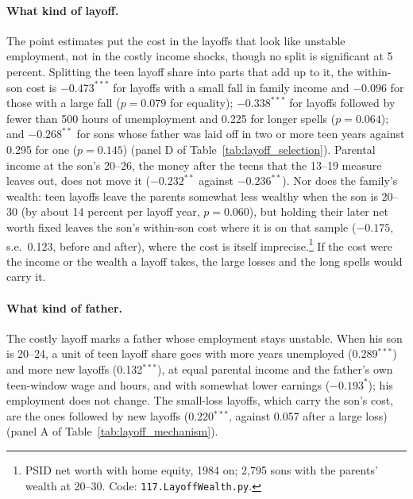 \paragraph{What kind of layoff.} The point estimates put the cost in the layoffs that look like unstable employment,
not in the costly income shocks, though no split is significant at 5 percent. Splitting the teen layoff share into parts that add up to it, the within-son cost is $-0.473^{***}$ for
layoffs with a small fall in family income and $-0.096$ for those with a large fall ($p = 0.079$ for equality);
$-0.338^{***}$ for layoffs followed by fewer than 500 hours of unemployment and 0.225 for longer spells ($p = 0.064$);
and $-0.268^{**}$ for sons whose father was laid off in two or more teen years against 0.295 for one ($p = 0.145$)
(panel D of Table~\ref{tab:layoff_selection}). Parental income at the son's 20--26, the money after the teens that the
13--19 measure leaves out, does not move it ($-0.232^{**}$ against $-0.236^{**}$). Nor does the family's wealth: teen
layoffs leave the parents somewhat less wealthy when the son is 20--30 (by about 14 percent per layoff year, $p = 0.060$),
but holding their later net worth fixed leaves the son's within-son cost where it is on that sample ($-0.175$, s.e.\ 0.123,
before and after), where the cost is itself imprecise.\footnote{PSID net worth with home
equity, 1984 on; 2,795 sons with the parents' wealth at 20--30. Code: \texttt{117.LayoffWealth.py}.} If the cost were
the income or the wealth a layoff takes, the large losses and the long spells would carry it.

\paragraph{What kind of father.} The costly layoff marks a father whose employment stays unstable. When his son is
20--24, a unit of teen layoff share goes with more years unemployed (0.289$^{***}$) and more new layoffs (0.132$^{***}$),
at equal parental income and the father's own teen-window wage and hours, and with somewhat lower earnings
($-0.193^{*}$); his employment does not change. The small-loss layoffs, which carry the son's cost, are the ones
followed by new layoffs (0.220$^{***}$, against 0.057 after a large loss) (panel A of Table~\ref{tab:layoff_mechanism}).

